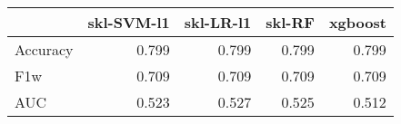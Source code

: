 \begin{tabular}{lrrrr}
\toprule
{} &  skl-SVM-l1 &  skl-LR-l1 &  skl-RF &  xgboost \\
\midrule
Accuracy &       0.799 &      0.799 &   0.799 &    0.799 \\
F1w      &       0.709 &      0.709 &   0.709 &    0.709 \\
AUC      &       0.523 &      0.527 &   0.525 &    0.512 \\
\bottomrule
\end{tabular}
